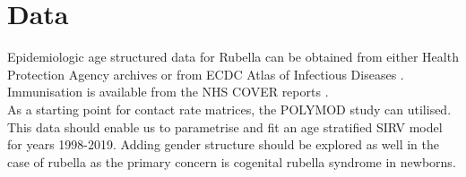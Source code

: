 \documentclass{article}
\theoremstyle{definition}
\begin{document}
\section{Data}
Epidemiologic age structured data for Rubella can be obtained from either Health Protection Agency archives \cite{agency_epidemiological_nodate} or from ECDC Atlas of Infectious Diseases \cite{noauthor_surveillance_nodate}.\\
Immunisation is available from the NHS COVER reports \cite{noauthor_childhood_nodate}.\\
As a starting point for contact rate matrices, the POLYMOD study \cite{mossong_social_2008} can utilised.\\
This data should enable us to parametrise and fit an age stratified SIRV model for years 1998-2019. Adding gender structure should be explored as well in the case of rubella as the primary concern is cogenital rubella syndrome in newborns. 
\newpage
\printbibliography  
\end{document}
